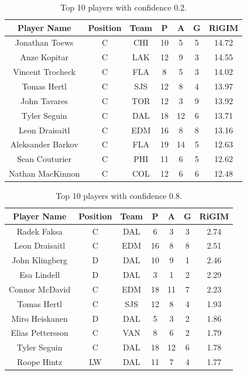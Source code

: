 \documentclass{article}
\newcommand{\sys}{RiGIM}
\begin{document}
\begin{table}[htbp]
\centering
\caption{Top 10 players with confidence 0.2.}\label{table:player-ranking-0.2}
\begin{tabular}{ccccccc}
\toprule
Player Name  & Position & Team  & P & A & G & \sys \\ \hline
Jonathan Toews & C & CHI & 10 & 5 & 5 & 14.72\\ 
Anze Kopitar & C & LAK & 12 & 9 & 3 & 14.55\\ 
Vincent Trocheck & C & FLA & 8 & 5 & 3 & 14.02\\ 
Tomas Hertl & C & SJS & 12 & 8 & 4 & 13.97\\ 
John Tavares & C & TOR & 12 & 3 & 9 & 13.92\\ 
Tyler Seguin & C & DAL & 18 & 12 & 6 & 13.71\\ 
Leon Draisaitl & C & EDM & 16 & 8 & 8 & 13.16\\ 
Aleksander Barkov & C & FLA & 19 & 14 & 5 & 12.63\\ 
Sean Couturier & C & PHI & 11 & 6 & 5 & 12.62\\ 
Nathan MacKinnon & C & COL & 12 & 6 & 6 & 12.48\\ 
\bottomrule
\end{tabular}
\end{table}
\begin{table}[htbp]
\centering
\caption{Top 10 players with confidence 0.8.}\label{table:player-ranking-0.8}
\begin{tabular}{ccccccc}
\toprule
Player Name  & Position & Team  & P & A & G & \sys \\ \hline
Radek Faksa & C & DAL & 6 & 3 & 3 & 2.74\\ 
Leon Draisaitl & C & EDM & 16 & 8 & 8 & 2.51\\ 
John Klingberg & D & DAL & 10 & 9 & 1 & 2.46\\ 
Esa Lindell & D & DAL & 3 & 1 & 2 & 2.29\\ 
Connor McDavid & C & EDM & 18 & 11 & 7 & 2.23\\ 
Tomas Hertl & C & SJS & 12 & 8 & 4 & 1.93\\ 
Miro Heiskanen & D & DAL & 5 & 3 & 2 & 1.86\\ 
Elias Pettersson & C & VAN & 8 & 6 & 2 & 1.79\\ 
Tyler Seguin & C & DAL & 18 & 12 & 6 & 1.78\\ 
Roope Hintz & LW & DAL & 11 & 7 & 4 & 1.77\\ 
\bottomrule
\end{tabular}
\end{table}
\end{document}
